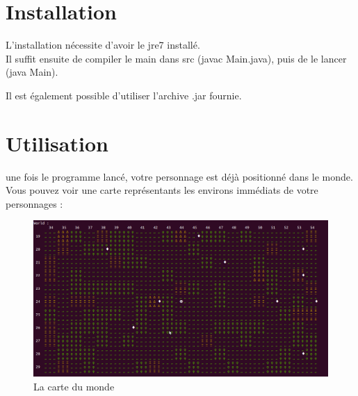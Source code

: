 \documentclass[asi]{picINSA}
\begin{document}
	
	\couverture{}

\tableofcontents{}


\chapter{Installation}

L'installation nécessite d'avoir le jre7 installé. \\

Il suffit ensuite de compiler le main dans src (javac Main.java), puis de le lancer (java Main).

Il est également possible d'utiliser l'archive .jar fournie. \\

\chapter{Utilisation}
une fois le programme lancé, votre personnage est déjà positionné dans le monde. Vous pouvez voir une carte représentants les environs immédiats de votre personnages :

\begin{figure}[!ht]
  \begin{center}
    \includegraphics[width=1\textwidth]{images/screenshootCarte01.png}
    \caption{La carte du monde}	
  \end{center}
\end{figure}
\end{document}
